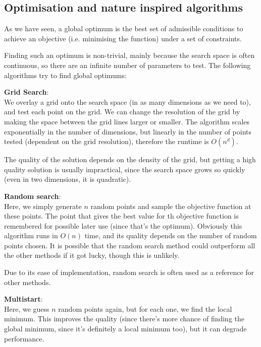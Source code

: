 
\subsection{Optimisation and nature inspired algorithms}

As we have seen, a global optimum is the best set of admissible conditions to
achieve an objective (i.e. minimising the function) under a set of constraints.

Finding such an optimum is non-trivial, mainly because the search space is often
continuous, so there are an infinite number of parameters to test. The following
algorithms try to find global optimums:

\begin{description}
  \item \textbf{Grid Search}:\\
  We overlay a grid onto the search space (in as many dimensions as we need to),
  and test each point on the grid. We can change the resolution of the grid by
  making the space between the grid lines larger or smaller. The algorithm
  scales exponentially in the number of dimensions, but linearly in the number
  of points tested (dependent on the grid resolution), therefore the runtime is
  $O(n^d)$.

  The quality of the solution depends on the density of the grid, but getting a
  high quality solution is usually impractical, since the search space grows so
  quickly (even in two dimensions, it is quadratic).

  \item \textbf{Random search}:\\
  Here, we simply generate $n$ random points and sample the objective function
  at these points. The point that gives the best value for th objective
  function is remembered for possible later use (since that's the optimum).
  Obviously this algorithm runs in $O(n)$ time, and its quality depends on the
  number of random points chosen. It is possible that the random search method
  could outperform all the other methods if it got lucky, though this is
  unlikely.

  Due to its ease of implementation, random search is often used as a reference
  for other methods.

  \item \textbf{Multistart}:\\

  Here, we guess $n$ random points again, but for each one, we find the local
  minimum. This improves the quality (since there's more chance of finding the
  global minimum, since it's definitely a local minimum too), but it can degrade
  performance.


\end{description}
